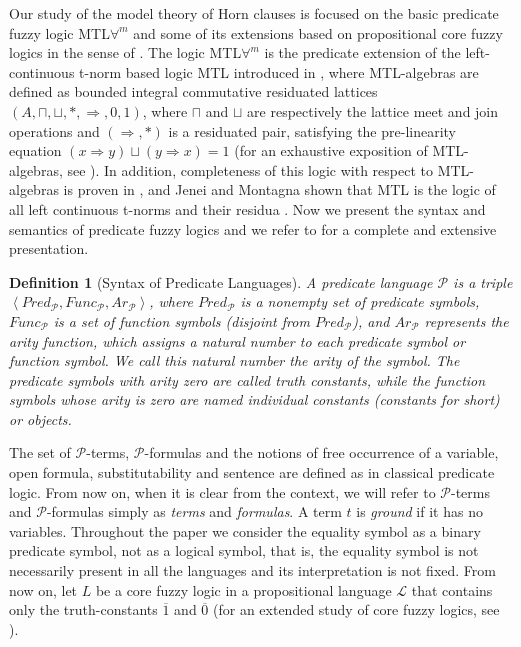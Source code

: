 \documentclass{IOS-Book-Article}
\newtheorem{defi}{Definition}
\begin{document}
Our study of the model theory of Horn clauses is focused on the basic predicate fuzzy logic MTL$\forall^m$ and some of its extensions based on propositional core fuzzy logics in the sense of \cite{CiHa10}. The logic MTL$\forall^m$ is the predicate extension of the left-continuous t-norm based logic MTL introduced in \cite{EsGo01}, where MTL-algebras are defined as bounded integral commutative residuated lattices $(A,\sqcap,\sqcup,*,\Rightarrow,0,1)$, where $\sqcap$ and $\sqcup$ are respectively the lattice meet and join operations and $(\Rightarrow,*)$ is a residuated pair, satisfying the pre-linearity equation $(x\Rightarrow y)\sqcup(y\Rightarrow x)=1$ (for an exhaustive exposition of MTL-algebras, see \cite{NoEsGis05}). In addition, completeness of this logic with respect to MTL-algebras is proven in \cite[Th.1]{EsGo01}, and Jenei and Montagna shown that MTL is the logic of all left continuous t-norms and their residua \cite{JeMon02}. Now we present the syntax and semantics of predicate fuzzy logics and we refer to \cite[Ch.1]{CiHaNo11} for a complete and extensive presentation.


\begin{defi} [Syntax of Predicate Languages]
 A \emph{predicate language} $\mathcal{P}$ is a  triple $\left\langle Pred_{\mathcal{P}},Func_{\mathcal{P}},Ar_{\mathcal{P}} \right\rangle$, where $Pred_{\mathcal{P}}$ is a nonempty set of \emph{predicate symbols}, $Func_{\mathcal{P}}$ is a set of \emph{function symbols} (disjoint from $Pred_{\mathcal{P}}$), and $Ar_{\mathcal{P}}$ represents the \emph{arity function}, which assigns a natural number to each predicate symbol or function symbol. We call this natural number the \emph{arity of the symbol}. The predicate symbols with arity zero are called \emph{truth constants}, while the function symbols whose arity is zero are named \emph{individual constants} (\emph{constants} for short) or \emph{objects}. 
\end{defi}

The set of $\mathcal{P}$-terms, $\mathcal{P}$-formulas and the notions of free occurrence of a variable, open formula, substitutability and sentence are defined as in classical predicate logic. From now on, when it is clear from the context, we will refer to $\mathcal{P}$-terms and $\mathcal{P}$-formulas simply as \emph{terms} and \emph{formulas}. A term $t$ is \emph{ground} if it has no variables. Throughout the paper we consider the equality symbol as a binary predicate symbol, not as a logical symbol, that is, the equality symbol is not necessarily present in all the languages and its interpretation is not fixed. From now on, let $L$ be a core fuzzy logic in a propositional language $\mathcal{L}$ that contains only the truth-constants $\overline{1}$ and $\overline{0}$ (for an extended study of core fuzzy logics, see \cite{CiHa10}).
\end{document}
